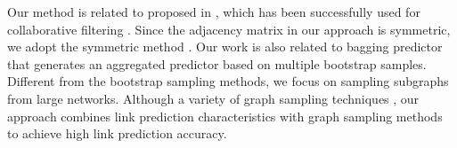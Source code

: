 Our method is related to \NMF proposed in \cite{NMF-nature99}, which
has been successfully used for collaborative
filtering \cite{web}. Since the adjacency matrix in our approach is symmetric, we adopt
the symmetric \NMF method \cite{ding}.  Our work is also related
to bagging predictor \cite{Breiman96b-1996} that generates an aggregated
predictor based on multiple bootstrap samples. Different from the bootstrap
sampling methods, we focus on sampling subgraphs from large networks. Although a
variety of graph sampling techniques 
, our approach combines link
prediction characteristics \cite{leskovec-2008} with graph sampling
methods to achieve high link prediction accuracy.






